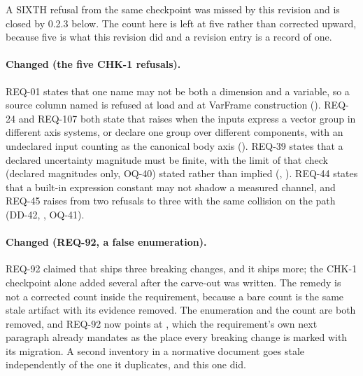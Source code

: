 A SIXTH refusal from the same checkpoint was missed by this revision and
is closed by 0.2.3 below. The count here is left at five rather than
corrected upward, because five is what this revision did and a revision
entry is a record of one.

\paragraph{Changed (the five CHK-1 refusals).} REQ-01 states that one
name may not be both a dimension and a variable, so a source column
named  is refused at load and at VarFrame construction
(). REQ-24 and REQ-107 both state that
 raises  when the inputs express a
vector group in different axis systems, or declare one group over
different components, with an undeclared input counting as the
canonical body axis (). REQ-39 states that a declared
uncertainty magnitude must be finite, with the limit of that check
(declared magnitudes only, OQ-40) stated rather than implied
(, ). REQ-44 states that a built-in
expression constant may not shadow a measured channel, and REQ-45
raises  from two refusals to three with the same
collision on the  path (DD-42, , OQ-41).

\paragraph{Changed (REQ-92, a false enumeration).} REQ-92 claimed that
 ships three breaking changes, and it ships more; the CHK-1
checkpoint alone added several after the carve-out was written. The
remedy is not a corrected count inside the requirement, because a bare
count is the same stale artifact with its evidence removed. The
enumeration and the count are both removed, and REQ-92 now points at
, which the requirement's own next paragraph already
mandates as the place every breaking change is marked with its
migration. A second inventory in a normative document goes stale
independently of the one it duplicates, and this one did.

